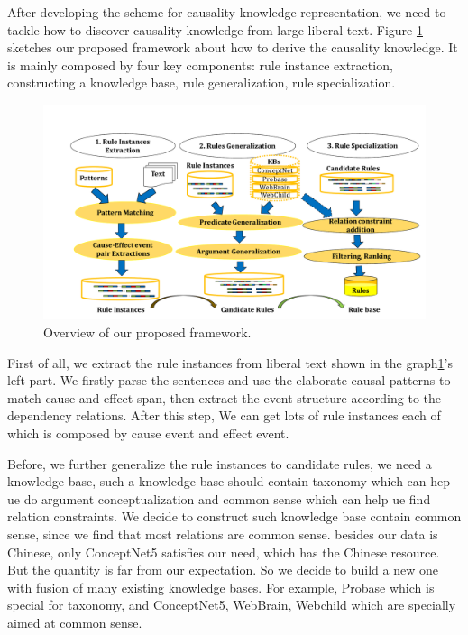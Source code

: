 After developing the scheme for causality knowledge representation, we need to tackle how to discover causality knowledge from large liberal text. Figure \ref{fig:overview} sketches our proposed framework about how to derive the causality knowledge. It is mainly composed by four key components: rule instance extraction, constructing a knowledge base, rule generalization, rule specialization. 
 \begin{figure}[htbp]
	\centerline{\includegraphics[width=\textwidth]{figures/overview}}
	\caption{Overview of our proposed framework.}
	\label{fig:overview}
\end{figure}


First of all, we extract the rule instances from liberal text shown in the graph\ref{fig:overview}'s left part. We firstly parse the sentences and use the elaborate causal patterns to match cause and effect span, then extract the event structure according to the dependency relations. After this step, We can get lots of rule instances each of which is composed by cause event and effect event.

Before, we further generalize the rule instances to candidate rules, we need a knowledge base, such a knowledge base should contain taxonomy which can hep ue do argument conceptualization and common sense which can help ue find relation constraints. We decide to construct such knowledge base contain common sense, since we find that most relations are common sense. besides our data is Chinese, only ConceptNet5\cite{speer2013conceptnet} satisfies our need, which has the Chinese resource. But the quantity is far from our expectation. So we decide to build a new one with fusion of many existing knowledge bases. For example, Probase\cite{wu2012probase} which is special for taxonomy, and ConceptNet5\cite{speer2013conceptnet}, WebBrain\cite{chen2016webbrain}, Webchild\cite{tandon2014webchild} which are specially aimed at  common sense.

